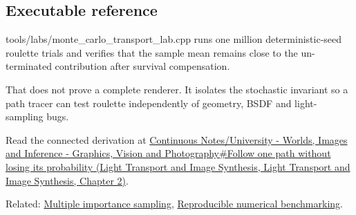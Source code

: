 \subsection{Executable reference}\label{appendix-7277c62d4599-executable-reference}

tools/labs/monte\_carlo\_transport\_lab.cpp runs one million deterministic-seed roulette trials and verifies that the sample mean remains close to the un-terminated contribution after survival compensation.

That does not prove a complete renderer. It isolates the stochastic invariant so a path tracer can test roulette independently of geometry, BSDF and light-sampling bugs.

Read the connected derivation at \href{../04-Light-Transport-and-Image-Synthesis/main.pdf\#nameddest=03-visual-computing-i-ch007-follow-one-path-without-losing-its-probability}{Continuous Notes/University - Worlds, Images and Inference - Graphics, Vision and Photography\#Follow one path without losing its probability (Light Transport and Image Synthesis, Light Transport and Image Synthesis, Chapter 2)}.

Related: \hyperref[appendix-ca8898faf1a6]{Multiple importance sampling}, \hyperref[appendix-b9db93e28371]{Reproducible numerical benchmarking}.
